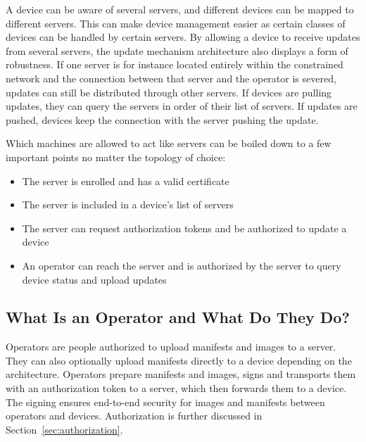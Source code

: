 \documentclass[0-thesis.tex]{subfiles}
\begin{document}
A device can be aware of several servers, and different devices can be mapped to different
servers. This can make device management easier as certain classes of devices can be
handled by certain servers. By allowing a device to receive updates from several servers,
the update mechanism architecture also displays a form of robustness. If one server is for
instance located entirely within the constrained network and the connection between that
server and the operator is severed, updates can still be distributed through other
servers. If devices are pulling updates, they can query the servers in order of their list
of servers. If updates are pushed, devices keep the connection with the server pushing the
update.

Which machines are allowed to act like servers can be boiled down to a few important
points no matter the topology of choice:

\begin{itemize}
    \item The server is enrolled and has a valid certificate
    \item The server is included in a device's list of servers
    \item The server can request authorization tokens and be authorized to update a device
    \item An operator can reach the server and is authorized by the server to query device
            status and upload updates
\end{itemize}

\subsection{What Is an Operator and What Do They Do?}
\label{ssec:what-is-an-operator}
Operators are people authorized to upload manifests and images to a server. They can also
optionally upload manifests directly to a device depending on the architecture. Operators
prepare manifests and images, signs and transports them with an authorization token to a
server, which then forwards them to a device. The signing ensures end-to-end security for
images and manifests between operators and devices. Authorization is further discussed in
Section~\ref{sec:authorization}.
\end{document}
